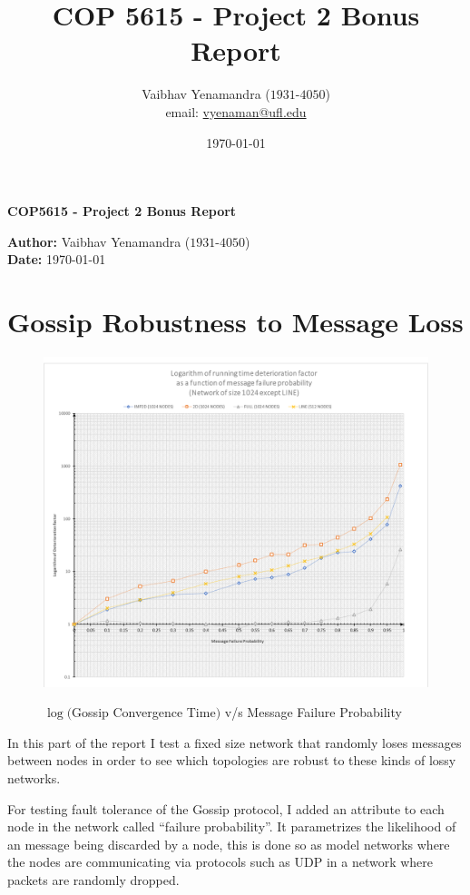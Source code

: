 \documentclass[a4paper, 10pt]{article}
\title{COP 5615 - Project 2 Bonus Report}
\author{Vaibhav Yenamandra ($1931$-$4050$)\\ email: \href{vyenaman@ufl.edu}{vyenaman@ufl.edu} }
\date{\today}
\begin{document}
    \begin{center}
      \textbf{COP5615 - Project 2 Bonus Report}
    \end{center}
    \textbf{Author:} Vaibhav Yenamandra ($1931$-$4050$)\\
    \textbf{Date:} \today

    \section{Gossip Robustness to Message Loss}
    \begin{figure}[h]
      \caption{$\log ($Gossip Convergence Time$)$ v/s Message Failure Probability}
      \includegraphics[width=\textwidth]{project2_bonus}
      \label{fig:slowdown}
    \end{figure}

    In this part of the report I test a fixed size network that randomly loses messages between nodes in order to see which topologies are robust to these kinds of lossy networks.

    For testing fault tolerance of the Gossip protocol, I added an attribute to each node in the network called ``failure probability''. It parametrizes the likelihood of an message being discarded by a node, this is done so as model networks where the nodes are communicating via protocols such as UDP in a network where packets are randomly dropped.
\end{document}
